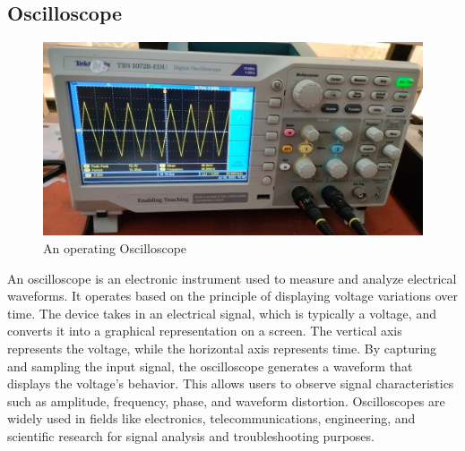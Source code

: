\subsection{Oscilloscope}
\begin{figure}[H]
    \centering
    \includegraphics[scale=0.15]{src/exp01/oscilloscope.jpeg}
    \caption{An operating Oscilloscope}
\end{figure}
An oscilloscope is an electronic instrument used to measure and analyze electrical waveforms. It operates based on the principle of displaying voltage variations over time. The device takes in an electrical signal, which is typically a voltage, and converts it into a graphical representation on a screen. The vertical axis represents the voltage, while the horizontal axis represents time. By capturing and sampling the input signal, the oscilloscope generates a waveform that displays the voltage's behavior. This allows users to observe signal characteristics such as amplitude, frequency, phase, and waveform distortion. Oscilloscopes are widely used in fields like electronics, telecommunications, engineering, and scientific research for signal analysis and troubleshooting purposes.

